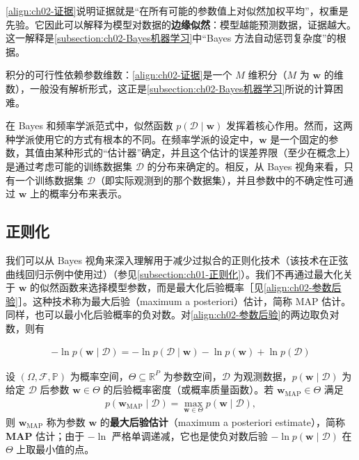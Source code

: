 \documentclass[../../main.tex]{subfiles}
\begin{document}
\begin{remark}
\eqref{align:ch02-证据}说明证据就是“在所有可能的参数值上对似然加权平均”，权重是先验。它因此可以解释为模型对数据的\textbf{边缘似然}：模型越能预测数据，证据越大。这一解释是\cref{subsection:ch02-Bayes机器学习}中“Bayes 方法自动惩罚复杂度”的根据。

积分的可行性依赖参数维数：\eqref{align:ch02-证据}是一个 $M$ 维积分（$M$ 为 $\mathbf{w}$ 的维数），一般没有解析形式，这正是\cref{subsection:ch02-Bayes机器学习}所说的计算困难。
\end{remark}

在 Bayes 和频率学派范式中，似然函数 $p(\mathcal{D}\mid\mathbf{w})$ 发挥着核心作用。然而，这两种学派使用它的方式有根本的不同。在频率学派的设定中，$\mathbf{w}$ 是一个固定的参数，其值由某种形式的“估计器”确定，并且这个估计的误差界限（至少在概念上）是通过考虑可能的训练数据集 $\mathcal{D}$ 的分布来确定的。相反，从 Bayes 视角来看，只有一个训练数据集 $\mathcal{D}$（即实际观测到的那个数据集），并且参数中的不确定性可通过 $\mathbf{w}$ 上的概率分布来表示。

\subsection{正则化}\label{subsection:ch02-正则化}

我们可以从 Bayes 视角来深入理解用于减少过拟合的正则化技术（该技术在正弦曲线回归示例中使用过）（参见\cref{subsection:ch01-正则化}）。我们不再通过最大化关于 $\mathbf{w}$ 的似然函数来选择模型参数，而是最大化后验概率［见\eqref{align:ch02-参数后验}］。这种技术称为最大后验（maximum a posteriori）估计，简称 MAP 估计。同样，也可以最小化后验概率的负对数。对\eqref{align:ch02-参数后验}的两边取负对数，则有

\begin{align}
  -\ln p(\mathbf{w}\mid\mathcal{D}) = -\ln p(\mathcal{D}\mid\mathbf{w}) - \ln p(\mathbf{w}) + \ln p(\mathcal{D})
  \label{align:ch02-负对数后验}
\end{align}

\begin{definition}[最大后验估计]\label{definition:ch02-map}
设 $(\Omega,\mathcal{F},\mathbb{P})$ 为概率空间，$\Theta\subseteq\mathbb{R}^{P}$ 为参数空间，$\mathcal{D}$ 为观测数据，$p(\mathbf{w}\mid\mathcal{D})$ 为给定 $\mathcal{D}$ 后参数 $\mathbf{w}\in\Theta$ 的后验概率密度（或概率质量函数）。若 $\mathbf{w}_{\mathrm{MAP}}\in\Theta$ 满足
\begin{align*}
  p(\mathbf{w}_{\mathrm{MAP}}\mid\mathcal{D})=\max_{\mathbf{w}\in\Theta}p(\mathbf{w}\mid\mathcal{D}),
\end{align*}
则 $\mathbf{w}_{\mathrm{MAP}}$ 称为参数 $\mathbf{w}$ 的\textbf{最大后验估计}（maximum a posteriori estimate），简称 \textbf{MAP} 估计；由于 $-\ln$ 严格单调递减，它也是使负对数后验 $-\ln p(\mathbf{w}\mid\mathcal{D})$ 在 $\Theta$ 上取最小值的点。
\end{definition}
\end{document}
